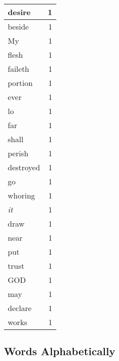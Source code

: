 \begin{center}
\begin{longtable}{l|r}
desire & 1 \\ \hline
beside & 1 \\ \hline
My & 1 \\ \hline
flesh & 1 \\ \hline
faileth & 1 \\ \hline
portion & 1 \\ \hline
ever & 1 \\ \hline
lo & 1 \\ \hline
far & 1 \\ \hline
shall & 1 \\ \hline
perish & 1 \\ \hline
destroyed & 1 \\ \hline
go & 1 \\ \hline
whoring & 1 \\ \hline
\emph{it} & 1 \\ \hline
draw & 1 \\ \hline
near & 1 \\ \hline
put & 1 \\ \hline
trust & 1 \\ \hline
GOD & 1 \\ \hline
may & 1 \\ \hline
declare & 1 \\ \hline
works & 1 \\ \hline
\end{longtable}
\end{center}



\normalsize



\subsection{Words Alphabetically}

